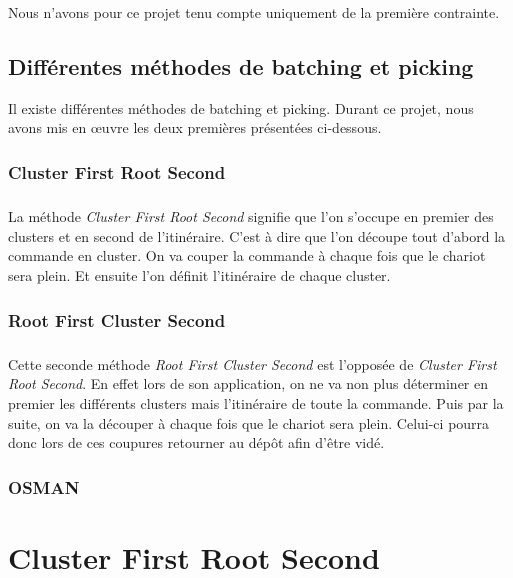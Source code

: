 \documentclass[twoside,UTF8]{EPURapport}
\begin{document}
Nous n'avons pour ce projet tenu compte uniquement de la première contrainte.

\section{Différentes méthodes de batching et picking}

Il existe différentes méthodes de batching et picking. Durant ce projet, nous avons mis en œuvre les deux premières présentées ci-dessous.

\subsection{Cluster First Root Second}
\label{sec:CFRS}

\paragraph{}La méthode \textit{Cluster First Root Second} signifie que l'on s'occupe en premier des clusters et en second de l'itinéraire. C'est à dire que l'on découpe tout d'abord la commande en cluster. On va couper la commande à chaque fois que le chariot sera plein. Et ensuite l'on définit l'itinéraire de chaque cluster. 

\subsection{Root First Cluster Second}
\label{sec:RFCS}
\paragraph{}Cette seconde méthode \textit{Root First Cluster Second} est l'opposée de \textit{Cluster First Root Second}. En effet lors de son application, on ne va non plus déterminer en premier les différents clusters mais l'itinéraire de toute la commande. Puis par la suite, on va la découper à chaque fois que le chariot sera plein. Celui-ci pourra donc lors de ces coupures retourner au dépôt afin d'être vidé.

\subsection{OSMAN}




\chapter{Cluster First Root Second}
\end{document}
